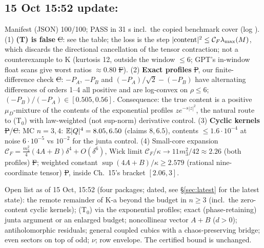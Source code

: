 \documentclass[11pt,a4paper]{article}
\begin{document}
\subsection*{15 Oct 15:52 update: }\label{sec:kweighted}
Manifest (JSON) 100/100;  PASS in 31 s incl.\ the copied benchmark cover (log ). (1) \textbf{(T) is false} \st{C}: see
the table; the loss is the step $|{\rm content}|^2\le\mathcal C_F\lambda_{\max}(M)$, which discards the directional cancellation of the tensor contraction; not a counterexample to K (kurtosis 12,
outside the window $\le6$; GPT's in-window float scans give worst ratios $\approx0.80$ \st{F}). (2) \textbf{Exact profiles} \st{P}, our finite-difference check \st{C}: $-P_A$, $-P_B$ and
$(-P_A)/\sqrt2-(-P_B)$ have alternating differences of orders 1--4 all positive and are log-convex on $\rho\le6$; $(-P_B)/(-P_A)\in[0.505,0.56]$. Consequence: the true content is a positive
$\mu_D$-mixture of the contents of the exponential profiles $ze^{-s|z|^2}$, the natural route to (T$_0$) with law-weighted (not sup-norm) derivative control. (3) \textbf{Cyclic kernels} \st{P}/\st{C}:
MC $n=3,4$: $\mathbb{E}|Q|^4=8.05,6.50$ (claims $8,6.5$), contents $\le1.6\cdot10^{-4}$ at noise $6\cdot10^{-5}$ vs $10^{-2}$ for the junta control. (4) Small-core expansion $\mathcal C_F=\frac{m_3^2}4(4A+B)\delta^4+O(\delta^6)$,
Wick limit $\mathcal C_F/\kappa\to11m_3^2/42\approx2.26$ (both profiles) \st{F}; weighted constant $\sup(4A+B)/\kappa\ge2.579$ (rational nine-coordinate tensor) \st{P}, inside Ch.~15's bracket $[2.06,3]$.

Open list as of 15 Oct, 15:52 (four packages; dated, see \S\ref{sec:latest} for the latest state): the remote remainder of K-a beyond the budget in $n\ge3$ (incl.\ the zero-content cyclic kernels); (T$_0$) via the exponential profiles; exact (phase-retaining) junta argument or an enlarged budget; noncollinear vector $A{+}B$ ($d>0$); antiholomorphic residuals; general coupled cubics with a chaos-preserving bridge; even sectors on top of odd; $\nu$; row envelope. The certified bound is unchanged.
\end{document}
